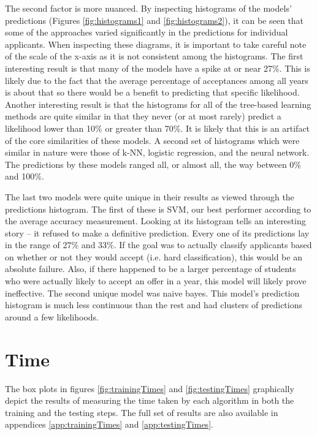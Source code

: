 The second factor is more nuanced. By inspecting histograms of the models' predictions (Figures \ref{fig:histograms1} and \ref{fig:histograms2}), it can be seen that some of the approaches varied significantly in the predictions for individual applicants. When inspecting these diagrams, it is important to take careful note of the scale of the x-axis as it is not consistent among the histograms. The first interesting result is that many of the models have a spike at or near 27\%. This is likely due to the fact that the average percentage of acceptances among all years is about that so there would be a benefit to predicting that specific likelihood. Another interesting result is that the histograms for all of the tree-based learning methods are quite similar in that they never (or at most rarely) predict a likelihood lower than 10\% or greater than 70\%. It is likely that this is an artifact of the core similarities of these models. A second set of histograms which were similar in nature were those of k-NN, logistic regression, and the neural network. The predictions by these models ranged all, or almost all, the way between 0\% and 100\%.

The last two models were quite unique in their results as viewed through the predictions histogram. The first of these is SVM, our best performer according to the average accuracy measurement. Looking at its histogram tells an interesting story -- it refused to make a definitive prediction. Every one of its predictions lay in the range of 27\% and 33\%. If the goal was to actually classify applicants based on whether or not they would accept (i.e. hard classification), this would be an absolute failure. Also, if there happened to be a larger percentage of students who were actually likely to accept an offer in a year, this model will likely prove ineffective. The second unique model was naive bayes. This model's prediction histogram is much less continuous than the rest and had clusters of predictions around a few likelihoods.



\section{Time}
The box plots in figures \ref{fig:trainingTimes} and \ref{fig:testingTimes} graphically depict the results of measuring the time taken by each algorithm in both the training and the testing steps. The full set of results are also available in appendices \ref{app:trainingTimes} and \ref{app:testingTimes}.

